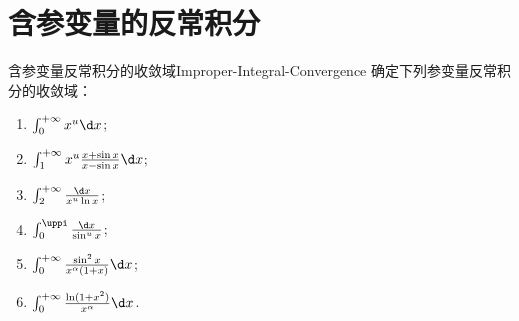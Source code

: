 \section{含参变量的反常积分}

\begin{problem}{含参变量反常积分的收敛域}{Improper-Integral-Convergence}
    确定下列参变量反常积分的收敛域：
    \begin{enumerate}
        \item $\int_0^{+\infty} x^u \d x$;
        \item $\int_1^{+\infty} x^u \frac{x + \sin x}{x - \sin x} \d x$;
        \item $\int_2^{+\infty} \frac{\d x}{x^u \ln x}$;
        \item $\int_0^{\uppi} \frac{\d x}{\sin^u x}$;
        \item $\int_0^{+\infty} \frac{\sin^2 x}{x^\alpha(1+x)} \d x$;
        \item $\int_0^{+\infty} \frac{\ln(1 + x^2)}{x^\alpha} \d x$.
    \end{enumerate}
\end{problem}

